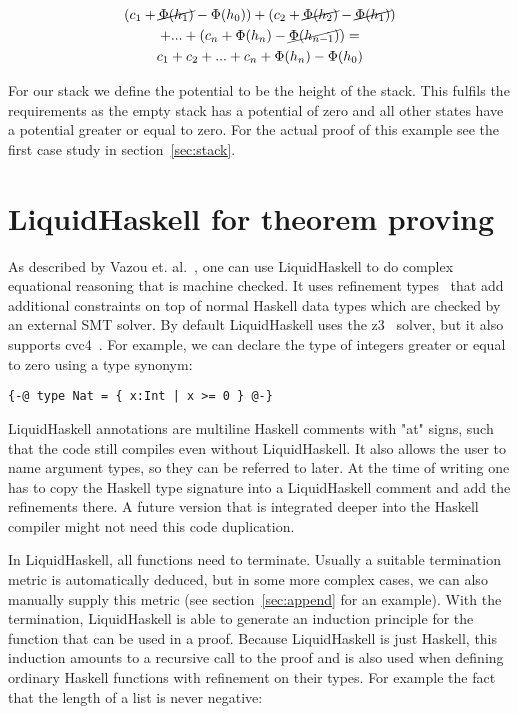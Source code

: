 \documentclass[sigplan,screen,review,anonymous]{acmart}
\begin{document}
\begin{gather}
\nonumber (c_1 + \cancel{\Phi(h_1)} - \Phi(h_0)) + (c_2 + \cancel{\Phi(h_2)} - \cancel{\Phi(h_1)}) \\
\nonumber    + ... + (c_n + \Phi(h_n) - \cancel{\Phi(h_{n - 1})}) = \\
  c_1 + c_2 + ... + c_n + \Phi(h_n) - \Phi(h_0) \label{eq:sum}
\end{gather}

For our stack we define the potential to be the height of the stack. This fulfils the requirements as the empty stack has a potential of zero and all other states have a potential greater or equal to zero. For the actual proof of this example see the first case study in section~\ref{sec:stack}.

\section{LiquidHaskell for theorem proving}\label{sec:liquidhaskell}

As described by Vazou et. al.~\cite{tpfa}, one can use LiquidHaskell to do complex equational reasoning that is machine checked. It uses refinement types~\cite{refinement_types} that add additional constraints on top of normal Haskell data types which are checked by an external SMT solver. By default LiquidHaskell uses the z3~\cite{z3} solver, but it also supports cvc4~\cite{cvc4}. For example, we can declare the type of integers greater or equal to zero using a type synonym:

\begin{lstlisting}
{-@ type Nat = { x:Int | x >= 0 } @-}
\end{lstlisting}

LiquidHaskell annotations are multiline Haskell comments with "at" signs, such that the code still compiles even without LiquidHaskell. It also allows the user to name argument types, so they can be referred to later. At the time of writing one has to copy the Haskell type signature into a LiquidHaskell comment and add the refinements there. A future version that is integrated deeper into the Haskell compiler might not need this code duplication.

In LiquidHaskell, all functions need to terminate. Usually a suitable termination metric is automatically deduced, but in some more complex cases, we can also manually supply this metric (see section~\ref{sec:append} for an example). With the termination, LiquidHaskell is able to generate an induction principle for the function that can be used in a proof. Because LiquidHaskell is just Haskell, this induction amounts to a recursive call to the proof and is also used when defining ordinary Haskell functions with refinement on their types. For example the fact that the length of a list is never negative:
\end{document}

